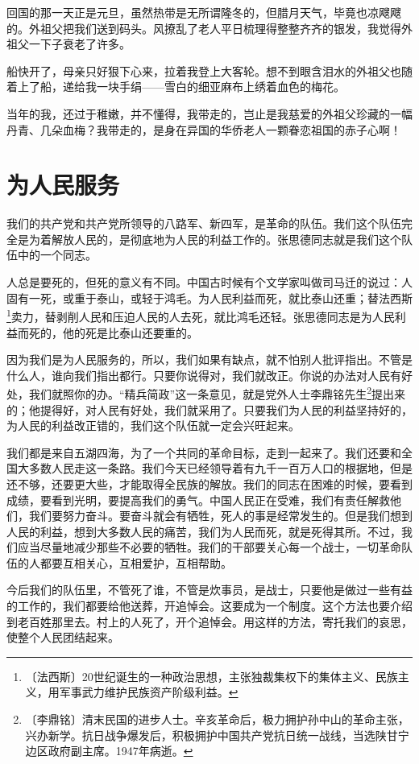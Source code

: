 \documentclass[12pt,UTF-8,openany]{ctexbook}
\begin{document}
\begin{Large}
    回国的那一天正是元旦，虽然热带是无所谓隆冬的，但腊月天气，毕竟也凉飕飕的。外祖父把我们送到码头。风撩乱了老人平日梳理得整整齐齐的银发，我觉得外祖父一下子衰老了许多。
    
    船快开了，母亲只好狠下心来，拉着我登上大客轮。想不到眼含泪水的外祖父也随着上了船，递给我一块手绢——雪白的细亚麻布上绣着血色的梅花。
    
    当年的我，还过于稚嫩，并不懂得，我带走的，岂止是我慈爱的外祖父珍藏的一幅丹青、几朵血梅？我带走的，是身在异国的华侨老人一颗眷恋祖国的赤子心啊！
    
\end{Large}

\chapter{为人民服务}

\begin{Large}
    
    我们的共产党和共产党所领导的八路军、新四军，是革命的队伍。我们这个队伍完全是为着解放人民的，是彻底地为人民的利益工作的。张思德同志就是我们这个队伍中的一个同志。
    
    人总是要死的，但死的意义有不同。中国古时候有个文学家叫做司马迁的说过：人固有一死，或重于泰山，或轻于鸿毛。为人民利益而死，就比泰山还重；替法西斯\footnote{〔法西斯〕20世纪诞生的一种政治思想，主张独裁集权下的集体主义、民族主义，用军事武力维护民族资产阶级利益。}卖力，替剥削人民和压迫人民的人去死，就比鸿毛还轻。张思德同志是为人民利益而死的，他的死是比泰山还要重的。
    
    因为我们是为人民服务的，所以，我们如果有缺点，就不怕别人批评指出。不管是什么人，谁向我们指出都行。只要你说得对，我们就改正。你说的办法对人民有好处，我们就照你的办。“精兵简政”这一条意见，就是党外人士李鼎铭先生\footnote{〔李鼎铭〕清末民国的进步人士。辛亥革命后，极力拥护孙中山的革命主张，兴办新学。抗日战争爆发后，积极拥护中国共产党抗日统一战线，当选陕甘宁边区政府副主席。1947年病逝。}提出来的；他提得好，对人民有好处，我们就采用了。只要我们为人民的利益坚持好的，为人民的利益改正错的，我们这个队伍就一定会兴旺起来。
    
    我们都是来自五湖四海，为了一个共同的革命目标，走到一起来了。我们还要和全国大多数人民走这一条路。我们今天已经领导着有九千一百万人口的根据地，但是还不够，还要更大些，才能取得全民族的解放。我们的同志在困难的时候，要看到成绩，要看到光明，要提高我们的勇气。中国人民正在受难，我们有责任解救他们，我们要努力奋斗。要奋斗就会有牺牲，死人的事是经常发生的。但是我们想到人民的利益，想到大多数人民的痛苦，我们为人民而死，就是死得其所。不过，我们应当尽量地减少那些不必要的牺牲。我们的干部要关心每一个战士，一切革命队伍的人都要互相关心，互相爱护，互相帮助。
    
    今后我们的队伍里，不管死了谁，不管是炊事员，是战士，只要他是做过一些有益的工作的，我们都要给他送葬，开追悼会。这要成为一个制度。这个方法也要介绍到老百姓那里去。村上的人死了，开个追悼会。用这样的方法，寄托我们的哀思，使整个人民团结起来。
    
\end{Large}
\end{document}
